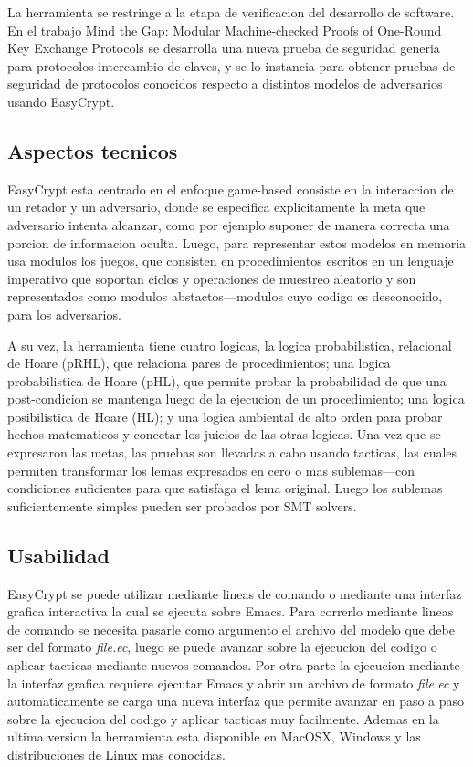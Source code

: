 \documentclass[runningheads]{llncs}
\begin{document}
La herramienta se restringe a la etapa de verificacion del desarrollo de software. En el trabajo Mind the Gap: Modular Machine-checked Proofs of One-Round Key Exchange Protocols\cite{ref_article2} se desarrolla una nueva prueba de seguridad generia para protocolos intercambio de claves, y se lo instancia para obtener pruebas de seguridad de protocolos conocidos respecto a distintos modelos de adversarios usando EasyCrypt.

\subsection{Aspectos tecnicos}

EasyCrypt esta centrado en el enfoque game-based consiste en la interaccion de un retador y un adversario, donde se especifica explicitamente la meta que adversario intenta alcanzar, como por ejemplo suponer de manera correcta una porcion de informacion oculta. Luego, para representar estos modelos en memoria usa modulos los juegos, que consisten en procedimientos escritos en un lenguaje imperativo que soportan ciclos y operaciones de muestreo aleatorio y son representados como modulos abstactos—modulos cuyo codigo es desconocido, para los adversarios.

A su vez, la herramienta tiene cuatro logicas, la logica probabilistica, relacional de Hoare (pRHL), que relaciona pares de procedimientos; una logica probabilistica de Hoare (pHL), que permite probar la probabilidad de que una post-condicion se mantenga luego de la ejecucion de un procedimiento; una logica posibilistica de Hoare (HL); y una logica ambiental de alto orden para probar hechos matematicos y conectar los juicios de las otras logicas. Una vez que se expresaron las metas, las pruebas son llevadas a cabo usando tacticas, las cuales permiten transformar los lemas expresados en cero o mas sublemas—con condiciones suficientes para que satisfaga el lema original. Luego los sublemas suficientemente simples pueden ser probados por SMT solvers.

\subsection{Usabilidad}
EasyCrypt se puede utilizar mediante lineas de comando o mediante una interfaz grafica interactiva la cual se ejecuta sobre Emacs\cite{ref_webpage2}. Para correrlo mediante lineas de comando se necesita pasarle como argumento el archivo del modelo que debe ser del formato \textit{file.ec}, luego se puede avanzar sobre la ejecucion del codigo o aplicar tacticas mediante nuevos comandos. Por otra parte la ejecucion mediante la interfaz grafica requiere ejecutar Emacs y abrir un archivo de formato \textit{file.ec} y automaticamente se carga una nueva interfaz que permite avanzar en paso a paso sobre la ejecucion del codigo y aplicar tacticas muy facilmente. Ademas en la ultima version la herramienta esta disponible en MacOSX, Windows y las distribuciones de Linux mas conocidas.
\end{document}
